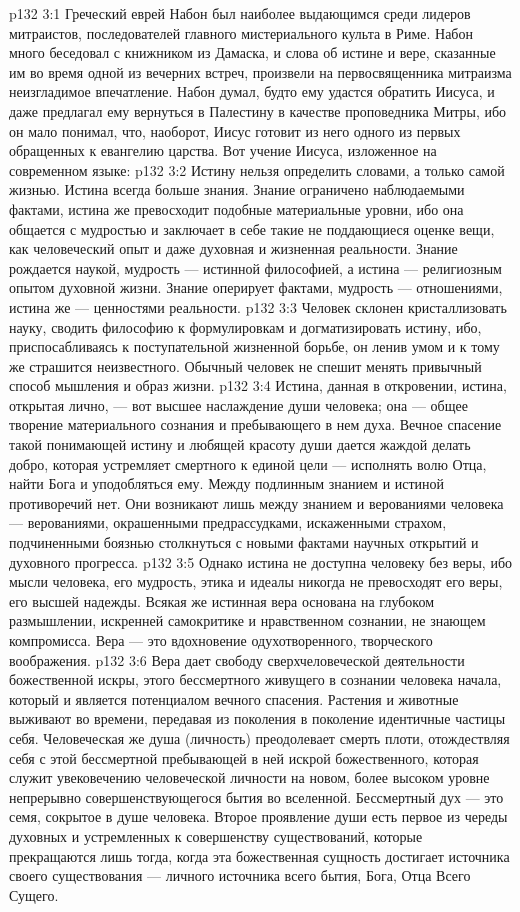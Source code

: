 \vs p132 3:1 Греческий еврей Набон был наиболее выдающимся среди лидеров митраистов, последователей главного мистериального культа в Риме. Набон много беседовал с книжником из Дамаска, и слова об истине и вере, сказанные им во время одной из вечерних встреч, произвели на первосвященника митраизма неизгладимое впечатление. Набон думал, будто ему удастся обратить Иисуса, и даже предлагал ему вернуться в Палестину в качестве проповедника Митры, ибо он мало понимал, что, наоборот, Иисус готовит из него одного из первых обращенных к евангелию царства. Вот учение Иисуса, изложенное на современном языке:
\vs p132 3:2 \pc Истину нельзя определить словами, а только самой жизнью. Истина всегда больше знания. Знание ограничено наблюдаемыми фактами, истина же превосходит подобные материальные уровни, ибо она общается с мудростью и заключает в себе такие не поддающиеся оценке вещи, как человеческий опыт и даже духовная и жизненная реальности. Знание рождается наукой, мудрость --- истинной философией, а истина --- религиозным опытом духовной жизни. Знание оперирует фактами, мудрость --- отношениями, истина же --- ценностями реальности.
\vs p132 3:3 Человек склонен кристаллизовать науку, сводить философию к формулировкам и догматизировать истину, ибо, приспосабливаясь к поступательной жизненной борьбе, он ленив умом и к тому же страшится неизвестного. Обычный человек не спешит менять привычный способ мышления и образ жизни.
\vs p132 3:4 Истина, данная в откровении, истина, открытая лично, --- вот высшее наслаждение души человека; она --- общее творение материального сознания и пребывающего в нем духа. Вечное спасение такой понимающей истину и любящей красоту души дается жаждой делать добро, которая устремляет смертного к единой цели --- исполнять волю Отца, найти Бога и уподобляться ему. Между подлинным знанием и истиной противоречий нет. Они возникают лишь между знанием и верованиями человека --- верованиями, окрашенными предрассудками, искаженными страхом, подчиненными боязнью столкнуться с новыми фактами научных открытий и духовного прогресса.
\vs p132 3:5 Однако истина не доступна человеку без веры, ибо мысли человека, его мудрость, этика и идеалы никогда не превосходят его веры, его высшей надежды. Всякая же истинная вера основана на глубоком размышлении, искренней самокритике и нравственном сознании, не знающем компромисса. Вера --- это вдохновение одухотворенного, творческого воображения.
\vs p132 3:6 Вера дает свободу сверхчеловеческой деятельности божественной искры, этого бессмертного живущего в сознании человека начала, который и является потенциалом вечного спасения. Растения и животные выживают во времени, передавая из поколения в поколение идентичные частицы себя. Человеческая же душа (личность) преодолевает смерть плоти, отождествляя себя с этой бессмертной пребывающей в ней искрой божественного, которая служит увековечению человеческой личности на новом, более высоком уровне непрерывно совершенствующегося бытия во вселенной. Бессмертный дух --- это семя, сокрытое в душе человека. Второе проявление души есть первое из череды духовных и устремленных к совершенству существований, которые прекращаются лишь тогда, когда эта божественная сущность достигает источника своего существования --- личного источника всего бытия, Бога, Отца Всего Сущего.
